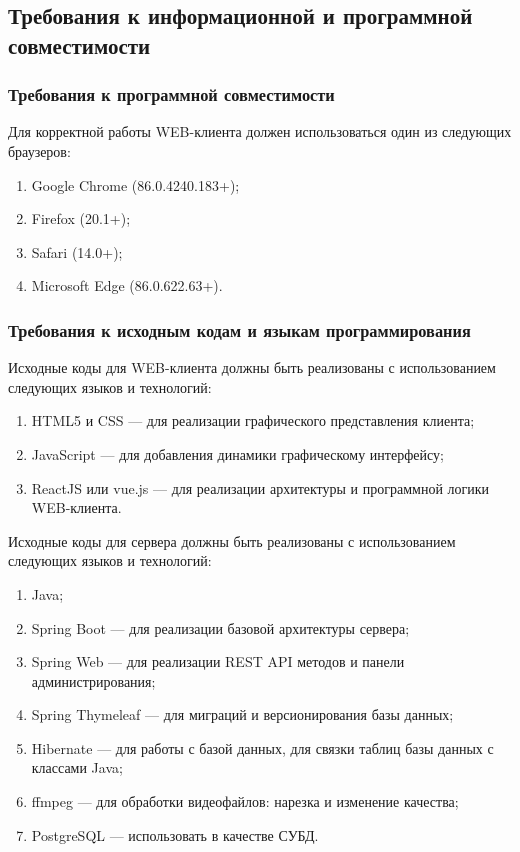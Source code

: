 \subsection{Требования к информационной и программной совместимости}

\subsubsection{Требования к программной совместимости}
Для корректной работы WEB-клиента должен использоваться один из следующих браузеров:
\begin{enumerate}[noitemsep]
    \item Google Chrome (86.0.4240.183+);
    \item Firefox (20.1+);
    \item Safari (14.0+);
    \item Microsoft Edge (86.0.622.63+).
\end{enumerate}

\subsubsection{Требования к исходным кодам и языкам программирования}

Исходные коды для WEB-клиента должны быть реализованы с использованием следующих языков и технологий:
\begin{enumerate}[noitemsep]
    \item HTML5 и CSS — для реализации графического представления клиента;
    \item JavaScript — для добавления динамики графическому интерфейсу;
    \item ReactJS или vue.js — для реализации архитектуры и программной логики WEB-клиента.
\end{enumerate}

Исходные коды для сервера должны быть реализованы с использованием следующих языков и технологий:
\begin{enumerate}[noitemsep]
    \item Java;
    \item Spring Boot — для реализации базовой архитектуры сервера;
    \item Spring Web — для реализации REST API методов и панели администрирования;
    \item Spring Thymeleaf — для миграций и версионирования базы данных;
    \item Hibernate — для работы с базой данных, для связки таблиц базы данных с классами Java;
    \item ffmpeg — для обработки видеофайлов: нарезка и изменение качества;
    \item PostgreSQL — использовать в качестве СУБД.
\end{enumerate}

